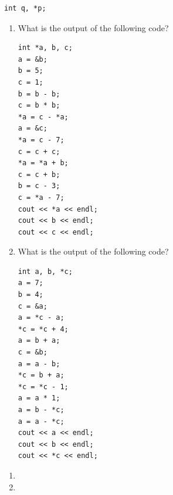 \noindent\begin{minipage}{\linewidth}\begin{lstlisting}
int q, *p;
\end{lstlisting}\end{minipage}


\begin{enumerate}
	\item What is the output of the following code? \nopagebreak[4]

\noindent\begin{minipage}{\linewidth}\begin{lstlisting}
int *a, b, c;
a = &b;
b = 5;
c = 1;
b = b - b;
c = b * b;
*a = c - *a;
a = &c;
*a = c - 7;
c = c + c;
*a = *a + b;
c = c + b;
b = c - 3;
c = *a - 7;
cout << *a << endl;
cout << b << endl;
cout << c << endl;
\end{lstlisting}\end{minipage}
	\item What is the output of the following code? \nopagebreak[4]

\noindent\begin{minipage}{\linewidth}\begin{lstlisting}
int a, b, *c;
a = 7;
b = 4;
c = &a;
a = *c - a;
*c = *c + 4;
a = b + a;
c = &b;
a = a - b;
*c = b + a;
*c = *c - 1;
a = a * 1;
a = b - *c;
a = a - *c;
cout << a << endl;
cout << b << endl;
cout << *c << endl;
\end{lstlisting}\end{minipage}
\end{enumerate}


\begin{enumerate}
	\item {}



	\item {}


\end{enumerate}


